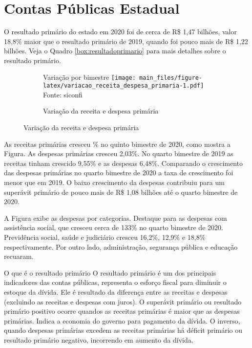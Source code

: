 \documentclass[twocolumn, a4paper, 10pt]{report}
\newcommand{\source}[1]{\scriptsize{Fonte: #1}\\}
\newcommand{\subcap}[1]{{\scriptsize\color{primarycolor}#1\newline}}
\newcommand{\abbr}[1]{\acrshort{#1}}
\begin{document}
    
    \hypertarget{contas-puxfablicas-estadual}{%
    \chapter{Contas Públicas
    Estadual}\label{contas-puxfablicas-estadual}}

    O resultado primário do estado em 2020 foi de cerca de R\$ 1,47
    bilhões, valor 18,8\% maior que o resultado primário de 2019, quando
    foi pouco mais de R\$ 1,22 bilhões. Veja o Quadro
    \ref{box:resultadoprimario} para mais detalhes sobre o resultado
    primário.

    \begin{figure}[!h]
    \begin{subfigure}{\linewidth}
    \caption{Variação da receita e despesa primária\label{fig:variacao_receita_despesa_primaria}}
    \subcap{Variação por bimestre}
    \texttt{[image: main\_files/figure-latex/variacao\_receita\_despesa\_primaria-1.pdf]}
    \source{\abbr{siconfi}}
    \end{subfigure}
    \end{figure}

    As receitas primárias cresceu \% no quinto bimestre de 2020, como
    mostra a Figura. As despesas primárias cresceu 2,03\%. No quarto
    bimestre de 2019 as receitas tinham crescido 9,55\% e as despesas
    6,48\%. Comparando o crescimento das despesas primárias no quarto
    bimestre de 2020 a taxa de crescimento foi menor que em 2019. O
    baixo crescimento da despesas contribuiu para um superávit primário
    de pouco mais de R\$ 1,08 bilhões até o quarto bimestre de 2020.

    A Figura exibe as despesas por categorias. Destaque para as despesas
    com assistência social, que cresceu cerca de 133\% no quarto
    bimestre de 2020. Previdência social, saúde e judiciário cresceu
    16,2\%, 12,9\% e 18,8\% respectivamente. Por outro lado,
    administração, segurança pública e educação recuaram.

    \begin{smbox}[label={box:resultadoprimario}]{O que é o resultado primário}
    O resultado primário é um dos principais indicadores das contas
    públicas, representa o esforço fiscal para diminuir o estoque da
    dívida. Ele é resultado da diferença entre as receitas e despesas
    (excluindo as receitas e despesas com juros). O superávit primário
    ou resultado primário positivo ocorre quandos as receitas primárias
    é maior que as despesas primárias. Indica a economia do governo para
    pagamento da dívida. O inverso, quando despesas primárias excedem as
    receitas primárias há déficit primário ou resultado primário
    negativo, incorrendo em aumento da dívida.

    \end{smbox}
\end{document}
